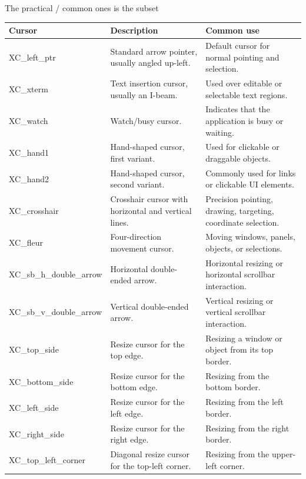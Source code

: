 \documentclass{report}
\begin{document}
\begin{itemize}
            The practical / common ones is the subset
            \begin{center}
                \begin{tabularx}{\textwidth}{@{}lXX@{}}
                    \toprule
                    \textbf{Cursor}&	\textbf{Description}&	\textbf{Common use} \\
                    \midrule
                    XC\_left\_ptr	&Standard arrow pointer, usually angled up-left.	&Default cursor for normal pointing and selection.\\[2ex]
                    XC\_xterm	&Text insertion cursor, usually an I-beam.	&Used over editable or selectable text regions.\\[2ex]
                    XC\_watch	&Watch/busy cursor.	&Indicates that the application is busy or waiting.\\[2ex]
                    XC\_hand1	&Hand-shaped cursor, first variant.	&Used for clickable or draggable objects.\\[2ex]
                    XC\_hand2	&Hand-shaped cursor, second variant.	&Commonly used for links or clickable UI elements.\\[2ex]
                    XC\_crosshair	&Crosshair cursor with horizontal and vertical lines.	&Precision pointing, drawing, targeting, coordinate selection.\\[2ex]
                    XC\_fleur	&Four-direction movement cursor.	&Moving windows, panels, objects, or selections.\\[2ex]
                    XC\_sb\_h\_double\_arrow	&Horizontal double-ended arrow.	&Horizontal resizing or horizontal scrollbar interaction.\\[2ex]
                    XC\_sb\_v\_double\_arrow	&Vertical double-ended arrow.	&Vertical resizing or vertical scrollbar interaction.\\[2ex]
                    XC\_top\_side	&Resize cursor for the top edge.	&Resizing a window or object from its top border.\\[2ex]
                    XC\_bottom\_side	&Resize cursor for the bottom edge.	&Resizing from the bottom border.\\[2ex]
                    XC\_left\_side	&Resize cursor for the left edge.	&Resizing from the left border.\\[2ex]
                    XC\_right\_side	&Resize cursor for the right edge.	&Resizing from the right border.\\[2ex]
                    XC\_top\_left\_corner&	Diagonal resize cursor for the top-left corner.	&Resizing from the upper-left corner.\\[2ex]

\end{tabularx}
\end{center}
\end{itemize}
\end{document}
